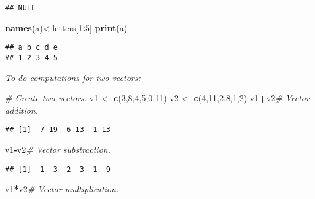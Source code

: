 \documentclass[]{book}
\newenvironment{Shaded}{\begin{snugshade}}{\end{snugshade}}
\newcommand{\KeywordTok}[1]{\textcolor[rgb]{0.13,0.29,0.53}{\textbf{#1}}}
\newcommand{\DecValTok}[1]{\textcolor[rgb]{0.00,0.00,0.81}{#1}}
\newcommand{\StringTok}[1]{\textcolor[rgb]{0.31,0.60,0.02}{#1}}
\newcommand{\CommentTok}[1]{\textcolor[rgb]{0.56,0.35,0.01}{\textit{#1}}}
\newcommand{\OperatorTok}[1]{\textcolor[rgb]{0.81,0.36,0.00}{\textbf{#1}}}
\newcommand{\NormalTok}[1]{#1}
\theoremstyle{definition}
\theoremstyle{definition}
\theoremstyle{definition}
\theoremstyle{remark}
\begin{document}
\begin{verbatim}
## NULL
\end{verbatim}

\begin{Shaded}
\begin{Highlighting}[]
\KeywordTok{names}\NormalTok{(a)<-letters[}\DecValTok{1}\OperatorTok{:}\DecValTok{5}\NormalTok{]}
\KeywordTok{print}\NormalTok{(a)}
\end{Highlighting}
\end{Shaded}

\begin{verbatim}
## a b c d e 
## 1 2 3 4 5
\end{verbatim}

\emph{To do computations for two vectors:}

\begin{Shaded}
\begin{Highlighting}[]
\CommentTok{# Create two vectors.}
\NormalTok{v1 <-}\StringTok{ }\KeywordTok{c}\NormalTok{(}\DecValTok{3}\NormalTok{,}\DecValTok{8}\NormalTok{,}\DecValTok{4}\NormalTok{,}\DecValTok{5}\NormalTok{,}\DecValTok{0}\NormalTok{,}\DecValTok{11}\NormalTok{)}
\NormalTok{v2 <-}\StringTok{ }\KeywordTok{c}\NormalTok{(}\DecValTok{4}\NormalTok{,}\DecValTok{11}\NormalTok{,}\DecValTok{2}\NormalTok{,}\DecValTok{8}\NormalTok{,}\DecValTok{1}\NormalTok{,}\DecValTok{2}\NormalTok{)}
\NormalTok{v1}\OperatorTok{+}\NormalTok{v2}\CommentTok{# Vector addition.}
\end{Highlighting}
\end{Shaded}

\begin{verbatim}
## [1]  7 19  6 13  1 13
\end{verbatim}

\begin{Shaded}
\begin{Highlighting}[]
\NormalTok{v1}\OperatorTok{-}\NormalTok{v2}\CommentTok{# Vector substraction.}
\end{Highlighting}
\end{Shaded}

\begin{verbatim}
## [1] -1 -3  2 -3 -1  9
\end{verbatim}

\begin{Shaded}
\begin{Highlighting}[]
\NormalTok{v1}\OperatorTok{*}\NormalTok{v2}\CommentTok{# Vector multiplication.}
\end{Highlighting}
\end{Shaded}
\end{document}
